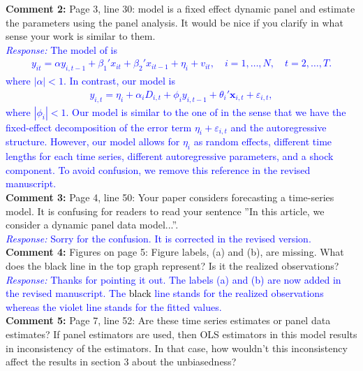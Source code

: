 \documentclass[12pt]{article}
\newcommand{\response}[1]{\noindent \textcolor{blue}{\emph{Response:} #1}}
\begin{document}
{\bf Comment 2:} Page 3, line 30: \citet{blundell1998initial} model is a fixed effect dynamic panel and estimate the parameters using the panel analysis. It would be nice if you clarify in what sense your work is similar to them. \\

\response{The model of \citet{blundell1998initial} is
\begin{align*}
  y_{it} = \alpha y_{i, t-1} + \beta_1'x_{it} + \beta_2'x_{it-1} + \eta_i + v_{it}, \quad i = 1, \ldots, N, \quad t = 2, \ldots, T.
\end{align*}
where $|\alpha|<1$. In contrast, our model is
\begin{align*}
 y_{i,t} =\eta_i +\alpha_i D_{i,t} + \phi_i y_{i, t-1} + \theta_i'\mathbf{x}_{i,t} + \varepsilon_{i,t},
\end{align*}
where $|\phi_i| < 1$. Our model is similar to the one of \citet{blundell1998initial}  in the sense that we have the fixed-effect decomposition of the error term $\eta_i +\varepsilon_{i,t}$ and the autoregressive structure. However, our model allows for $\eta_i$ as random effects, different time lengths for each time series, different autoregressive parameters, and a shock component. To avoid confusion, we  remove this reference in the revised manuscript.}\\

{\bf Comment 3:} Page 4, line 50: Your paper considers forecasting a time-series model. It is confusing for readers to read your sentence ”In this article, we consider a dynamic panel data model...''.\\

\response{Sorry for the confusion. It is corrected  in the revised version.}\\

{\bf  Comment 4:} Figures on page 5: Figure labels, (a) and (b), are missing. What does the black line in the top graph represent? Is it the realized observations?\\

\response{Thanks for pointing it out. The labels (a) and (b) are now added in the revised manuscript.   The \textcolor{black}{black} line stands for the realized observations whereas the violet line stands for the fitted values.} \\

{\bf Comment 5:} Page 7, line 52: Are these time series estimates or panel data estimates? If panel estimators are used, then OLS estimators in this model results in inconsistency of the estimators. In that case, how wouldn't this inconsistency affect the results in section 3 about the unbiasedness? \\
\end{document}
